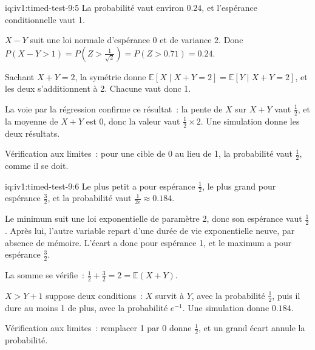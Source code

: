 \begin{solution}{iq:iv1:timed-test-9:5}
La probabilité vaut environ $0.24$, et l'espérance conditionnelle vaut 1.

$X - Y$ suit une loi normale d'espérance 0 et de variance 2. Donc $P(X - Y > 1) = P(Z > \frac{1}{\sqrt2}) = P(Z > 0.71) = 0.24$.

Sachant $X + Y = 2$, la symétrie donne $\mathbb{E}[X \mid X + Y = 2] = \mathbb{E}[Y \mid X + Y = 2]$, et les deux s'additionnent à 2. Chacune vaut donc 1.

La voie par la régression confirme ce résultat~: la pente de $X$ sur $X + Y$ vaut $\frac12$, et la moyenne de $X + Y$ est 0, donc la valeur vaut $\frac12 \times 2$. Une simulation donne les deux résultats.

Vérification aux limites~: pour une cible de 0 au lieu de 1, la probabilité vaut $\frac12$, comme il se doit.

\end{solution}

\begin{solution}{iq:iv1:timed-test-9:6}
Le plus petit a pour espérance $\frac12$, le plus grand pour espérance $\frac32$, et la probabilité vaut $\frac{1}{2e} \approx 0.184$.

Le minimum suit une loi exponentielle de paramètre 2, donc son espérance vaut $\frac12$. Après lui, l'autre variable repart d'une durée de vie exponentielle neuve, par absence de mémoire. L'écart a donc pour espérance 1, et le maximum a pour espérance $\frac32$.

La somme se vérifie~: $\frac12 + \frac32 = 2 = \mathbb{E}(X + Y)$.

$X > Y + 1$ suppose deux conditions~: $X$ survit à $Y$, avec la probabilité $\frac12$, puis il dure au moins 1 de plus, avec la probabilité $e^{-1}$. Une simulation donne $0.184$.

Vérification aux limites~: remplacer 1 par 0 donne $\frac12$, et un grand écart annule la probabilité.

\end{solution}

